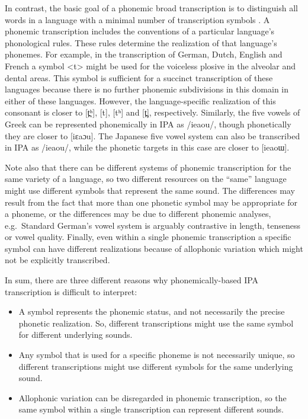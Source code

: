 In contrast, the basic goal of a phonemic broad transcription is to distinguish all
words in a language with a minimal number of transcription symbols
\citep[19]{Abercrombie1964}. A phonemic transcription includes the conventions
of a particular language's phonological rules. These rules determine the
realization of that language's phonemes. For example, in the transcription of
German, Dutch, English and French a symbol <t> might be used for the voiceless
plosive in the alveolar and dental areas. This symbol is sufficient for a succinct
transcription of these languages because there is no further phonemic
subdivisions in this domain in either of these languages. However, the
language-specific realization of this consonant is closer to [t̪ʰ], [t], [tʰ]
and [t̪], respectively. Similarly, the five vowels of Greek can be represented
phonemically in IPA as /ieaou/, though phonetically they are closer to [iεaɔu].
The Japanese five vowel system can also be transcribed in IPA as
/ieaou/, while the phonetic targets in this case are closer to [ieaoɯ].

Note also that there can be different systems of phonemic transcription for the
same variety of a language, so two different resources on the ``same'' language
might use different symbols that represent the same sound. The differences may
result from the fact that more than one phonetic symbol may be appropriate for a
phoneme, or the differences may be due to different phonemic analyses, e.g.\
Standard German's vowel system is arguably contrastive in length, tenseness or
vowel quality. Finally, even within a single phonemic transcription a specific
symbol can have different realizations because of allophonic variation which 
might not be explicitly transcribed.

In sum, there are three different reasons why phonemically-based IPA 
transcription is difficult to interpret:

\begin{itemize}
  
   \item A symbol represents the phonemic status, and not necessarily the
         precise phonetic realization. So, different transcriptions might use 
         the same symbol for different underlying sounds.
   \item Any symbol that is used for a specific phoneme is not necessarily
         unique, so different transcriptions might use different symbols for the
         same underlying sound.
   \item Allophonic variation can be disregarded in phonemic transcription, so
         the same symbol within a single transcription can represent different
         sounds.
  
\end{itemize}

